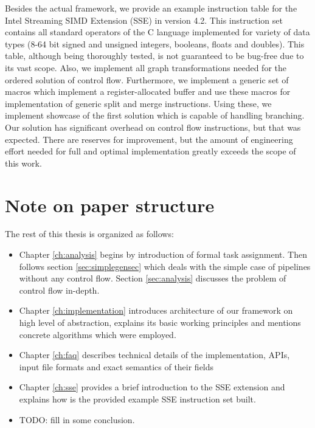 Besides the actual framework, we provide an example instruction table for the Intel Streaming SIMD Extension (SSE) in version 4.2. This instruction set contains all standard operators of the C language implemented for variety of data types (8-64 bit signed and unsigned integers, booleans, floats and doubles). This table, although being thoroughly tested, is not guaranteed to be bug-free due to its vast scope. Also, we implement all graph transformations needed for the ordered solution of control flow. Furthermore, we implement a generic set of macros which implement a register-allocated buffer and use these macros for implementation of generic split and merge instructions. Using these, we implement showcase of the first solution which is capable of handling branching. Our solution has significant overhead on control flow instructions, but that was expected. There are reserves for improvement, but the amount of engineering effort needed for full and optimal implementation greatly exceeds the scope of this work.

\section{Note on paper structure}

The rest of this thesis is organized as follows:
\begin{itemize}
  \item Chapter \ref{ch:analysis} begins by introduction of formal task assignment. Then follows section \ref{sec:simplegensec} which deals with the simple case of pipelines without any control flow. Section \ref{sec:analysis} discusses the problem of control flow in-depth.
  \item Chapter \ref{ch:implementation} introduces architecture of our framework on high level of abstraction, explains its basic working principles and mentions concrete algorithms which were employed.
  \item Chapter \ref{ch:faq} describes technical details of the implementation, APIs, input file formats and exact semantics of their fields
  \item Chapter \ref{ch:sse} provides a brief introduction to the SSE extension and explains how is the provided example SSE instruction set built.
  \item TODO: fill in some conclusion.
\end{itemize}



